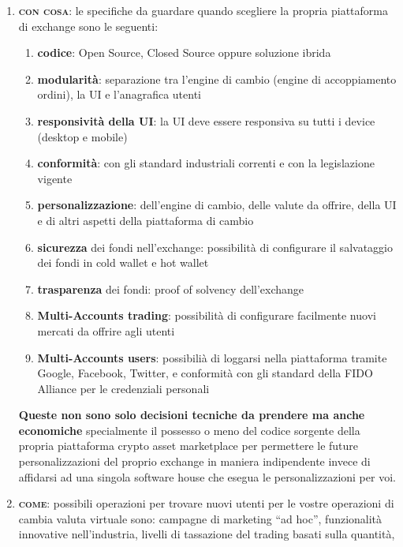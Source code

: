 \documentclass[11pt,fleqn]{book} %
\begin{document}
\begin{enumerate}
\begin{tcbraster}[raster columns=3,raster rows=2,raster height=5cm,
		valign=center, halign=center,
		enhanced,size=small,sharp corners,colframe=silver,coltext=black,
		colback=silver,fit algorithm=hybrid* ]
	\end{tcbraster}	

	\item \textbf{\textsc{con cosa}}: le specifiche da guardare quando scegliere la propria piattaforma di exchange sono le seguenti: 
		\begin{enumerate}[label*=\arabic*.]
			\item \textbf{codice}: Open Source, Closed Source oppure soluzione ibrida
			\item \textbf{modularità}: separazione tra l'engine di cambio (engine di accoppiamento ordini), la UI e l'anagrafica utenti
			\item \textbf{responsività della UI}: la UI deve essere responsiva su tutti i device (desktop e mobile)
			\item \textbf{conformità}: con gli standard industriali correnti e con la legislazione vigente
			\item \textbf{personalizzazione}: dell'engine di cambio, delle valute da offrire, della UI e di altri aspetti della piattaforma di cambio
			\item \textbf{sicurezza} dei fondi nell'exchange: possibilità di configurare il salvataggio dei fondi in cold wallet e hot wallet
			\item \textbf{trasparenza} dei fondi: proof of solvency dell'exchange
			\item \textbf{Multi-Accounts trading}: possibilità di configurare facilmente nuovi mercati da offrire agli utenti
			\item \textbf{Multi-Accounts users}: possibilià di loggarsi nella piattaforma tramite Google, Facebook, Twitter, e conformità
			con gli standard della FIDO Alliance per le credenziali personali
		\end{enumerate}	
	\textbf{Queste non sono solo decisioni tecniche da prendere ma anche economiche} specialmente il possesso o meno del codice sorgente della propria 
	piattaforma	crypto asset marketplace per permettere le future personalizzazioni del proprio exchange in maniera indipendente invece di affidarsi
	ad una singola software house che esegua le personalizzazioni per voi.
	\item \textbf{\textsc{come}}: possibili operazioni per trovare nuovi utenti per le vostre operazioni di cambia valuta virtuale sono:
	campagne di marketing ``ad hoc'', funzionalità innovative nell'industria, livelli di tassazione del trading basati sulla quantità, 

\end{enumerate}
\end{document}
